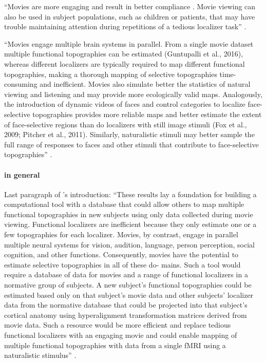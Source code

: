 %
``Movies are more engaging and result in better compliance
\citep{vanderwal2015inscapes}. Movie viewing can also be used in subject
populations, such as children \citep{richardson2018development} or patients,
that may have trouble maintaining attention during repetitions of a tedious
localizer task'' \citep{jiahui2020predicting}.

%
``Movies engage multiple brain systems in parallel. From a single movie dataset
multiple functional topographies can be estimated (Guntupalli et al., 2016),
whereas different localizers are typically required to map different functional
topographies, making a thorough mapping of selective topographies
time-consuming and inefficient. Movies also simulate better the statistics of
natural viewing and listening and may provide more ecologically valid maps.
Analogously, the introduction of dynamic videos of faces and control categories
to localize face-selective topographies provides more reliable maps and better
estimate the extent of face-selective regions than do localizers with still
image stimuli (Fox et al., 2009; Pitcher et al., 2011). Similarly, naturalistic
stimuli may better sample the full range of responses to faces and other stimuli
that contribute to face-selective topographies'' \citep{jiahui2020predicting}.

\paragraph{in general}

Last paragraph of \citet{jiahui2020predicting}'s introduction: ``These results
lay a foundation for building a computational tool with a database that could
allow others to map multiple functional topographies in new subjects using only
data collected during movie viewing. Functional localizers are inefficient
because they only estimate one or a few topographies for each localizer. Movies,
by contrast, engage in parallel multiple neural systems for vision, audition,
language, person perception, social cognition, and other functions.
Consequently, movies have the potential to estimate selective topographies in
all of these do- mains. Such a tool would require a database of data for movies
and a range of functional localizers in a normative group of subjects. A new
subject’s functional topographies could be estimated based only on that
subject’s movie data and other subjects’ localizer data from the normative
database that could be projected into that subject’s cortical anatomy using
hyperalignment transformation matrices derived from movie data. Such a resource
would be more efficient and replace tedious functional localizers with an
engaging movie and could enable mapping of multiple functional topographies with
data from a single fMRI using a naturalistic stimulus''
\citet{jiahui2020predicting}.

